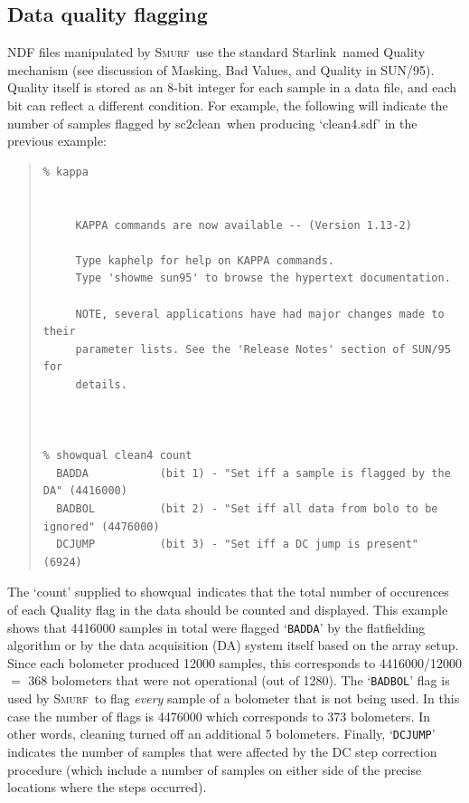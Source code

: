 \documentclass[twoside,11pt]{article}
\newcommand{\htmladdnormallink}[2]{#1}
\newcommand{\xref}[3]{#1}
\newcommand{\xlabel}[1]{}
\renewcommand{\_}{\texttt{\symbol{95}}}
\newenvironment{myquote}{\begin{quote}\begin{small}}{\end{small}\end{quote}}
\newcommand{\starlink}{\htmladdnormallink{Starlink}{http://starlink.jach.hawaii.edu}}
\newcommand{\smurf}{\xref{\textsc{Smurf}}{sun258}{}}
\newcommand{\task}[1]{\textsf{#1}}
\newcommand{\clean}{\xref{\task{sc2clean}}{sun258}{SC2CLEAN}}
\newcommand{\showqual}{\xref{\task{showqual}}{sun95}{SHOWQUAL}}
\begin{document}
\subsection{\xlabel{quality}Data quality flagging}
\label{sec:quality}

NDF files manipulated by \smurf\ use the standard \starlink\ named
Quality mechanism (see discussion of \xref{Masking, Bad Values, and
  Quality}{sun95}{se_masking} in \xref{SUN/95}{sun95}{}). Quality
itself is stored as an 8-bit integer for each sample in a data file,
and each bit can reflect a different condition. For example, the
following will indicate the number of samples flagged by \clean\ when
producing `clean4.sdf' in the previous example:

\begin{myquote}
\begin{verbatim}
% kappa


     KAPPA commands are now available -- (Version 1.13-2)

     Type kaphelp for help on KAPPA commands.
     Type 'showme sun95' to browse the hypertext documentation.

     NOTE, several applications have had major changes made to their
     parameter lists. See the 'Release Notes' section of SUN/95 for
     details.



% showqual clean4 count
  BADDA           (bit 1) - "Set iff a sample is flagged by the DA" (4416000)
  BADBOL          (bit 2) - "Set iff all data from bolo to be ignored" (4476000)
  DCJUMP          (bit 3) - "Set iff a DC jump is present" (6924)
\end{verbatim}
\end{myquote}

The `count' supplied to \showqual\ indicates that the total number of
occurences of each Quality flag in the data should be counted and
displayed.  This example shows that 4416000 samples in total were
flagged `\texttt{BADDA}' by the flatfielding algorithm or by the data
acquisition (DA) system itself based on the array setup. Since each
bolometer produced 12000 samples, this corresponds to 4416000/12000
$=$ 368 bolometers that were not operational (out of 1280). The
`\texttt{BADBOL}' flag is used by \smurf\ to flag {\em every} sample
of a bolometer that is not being used. In this case the number of
flags is 4476000 which corresponds to 373 bolometers. In other words,
cleaning turned off an additional 5 bolometers. Finally,
`\texttt{DCJUMP}' indicates the number of samples that were affected
by the DC step correction procedure (which include a number of samples
on either side of the precise locations where the steps occurred).
\end{document}
